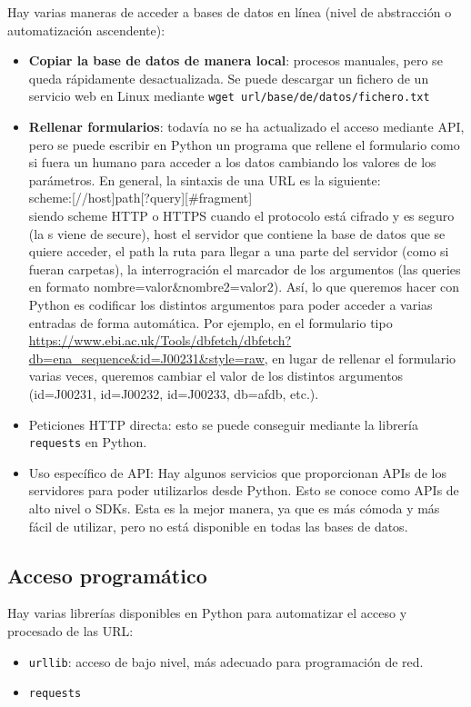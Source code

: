 Hay varias maneras de acceder a bases de datos en línea (nivel de abstracción o automatización ascendente):
\begin{itemize}
\item \textbf{Copiar la base de datos de manera local}: procesos manuales, pero se queda rápidamente desactualizada. Se puede descargar un fichero de un servicio web en Linux mediante \texttt{wget url/base/de/datos/fichero.txt}
\item \textbf{Rellenar formularios}: todavía no se ha actualizado el acceso mediante API, pero se puede escribir en Python un programa que rellene el formulario como si fuera un humano para acceder a los datos cambiando los valores de los parámetros. En general, la sintaxis de una URL es la siguiente:\\
scheme:[//host]path[?query][\#fragment]\\
siendo scheme HTTP o HTTPS cuando el protocolo está cifrado y es seguro (la s viene de secure), host el servidor que contiene la base de datos que se quiere acceder, el path la ruta para llegar a una parte del servidor (como si fueran carpetas), la interrogración el marcador de los argumentos (las queries en formato nombre=valor\&nombre2=valor2). Así, lo que queremos hacer con Python es codificar los distintos argumentos para poder acceder a varias entradas de forma automática. Por ejemplo, en el formulario tipo \href{https://www.ebi.ac.uk/Tools/dbfetch/dbfetch?db=ena\_sequence\&id=J00231\&style=raw}{https://www.ebi.ac.uk/Tools/dbfetch/dbfetch?db=ena\_sequence\&id=J00231\&style=raw}, en lugar de rellenar el formulario varias veces, queremos cambiar el valor de los distintos argumentos (id=J00231, id=J00232, id=J00233, db=afdb, etc.). 
\item Peticiones HTTP directa: esto se puede conseguir mediante la librería \texttt{requests} en Python.
\item Uso específico de API: Hay algunos servicios que proporcionan APIs de los servidores para poder utilizarlos desde Python. Esto se conoce como APIs de alto nivel o SDKs. Esta es la mejor manera, ya que es más cómoda y más fácil de utilizar, pero no está disponible en todas las bases de datos.
\end{itemize} 

\subsection{Acceso programático}
Hay varias librerías disponibles en Python para automatizar el acceso y procesado de las URL:
\begin{itemize}
\item \texttt{urllib}: acceso de bajo nivel, más adecuado para programación de red.
\item \texttt{requests}
\end{itemize}

